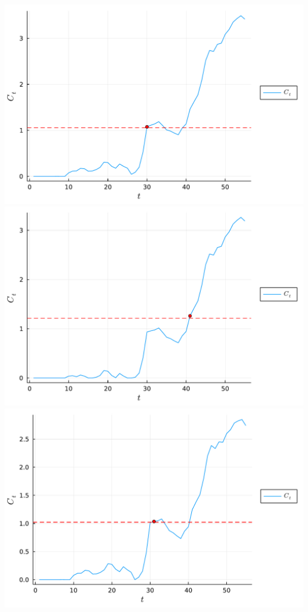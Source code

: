 \documentclass[12pt,a4paper]{article}
\begin{document}
\includegraphics[width=\linewidth]{figures/admissionsICU_10_1.pdf}
\includegraphics[width=\linewidth]{figures/admissionsICU_10_2.pdf}
\includegraphics[width=\linewidth]{figures/admissionsICU_10_3.pdf}
\end{document}
